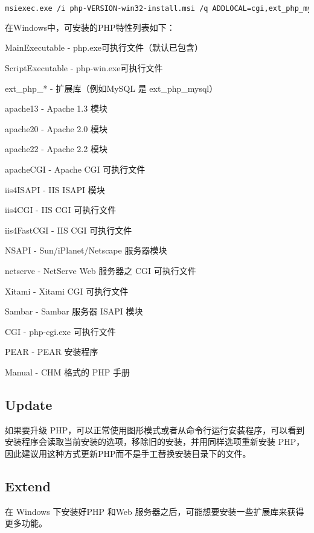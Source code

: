 \begin{lstlisting}[language=bash]
msiexec.exe /i php-VERSION-win32-install.msi /q ADDLOCAL=cgi,ext_php_mysqli
\end{lstlisting}


在Windows中，可安装的PHP特性列表如下：

\begin{compactitem}
\item MainExecutable - php.exe可执行文件（默认已包含）
\item ScriptExecutable - php-win.exe可执行文件
\item ext\_php\_* - 扩展库（例如MySQL 是 ext\_php\_mysql）
\item apache13 - Apache 1.3 模块
\item apache20 - Apache 2.0 模块
\item apache22 - Apache 2.2 模块
\item apacheCGI - Apache CGI 可执行文件
\item iis4ISAPI - IIS ISAPI 模块
\item iis4CGI - IIS CGI 可执行文件
\item iis4FastCGI - IIS CGI 可执行文件
\item NSAPI - Sun/iPlanet/Netscape 服务器模块
\item netserve - NetServe Web 服务器之 CGI 可执行文件
\item Xitami - Xitami CGI 可执行文件
\item Sambar - Sambar 服务器 ISAPI 模块
\item CGI - php-cgi.exe 可执行文件
\item PEAR - PEAR 安装程序
\item Manual - CHM 格式的 PHP 手册
\end{compactitem}

\subsection{Update}


如果要升级 PHP，可以正常使用图形模式或者从命令行运行安装程序，可以看到安装程序会读取当前安装的选项，移除旧的安装，并用同样选项重新安装 PHP，因此建议用这种方式更新PHP而不是手工替换安装目录下的文件。


\subsection{Extend}


在 Windows 下安装好PHP 和Web 服务器之后，可能想要安装一些扩展库来获得更多功能。

